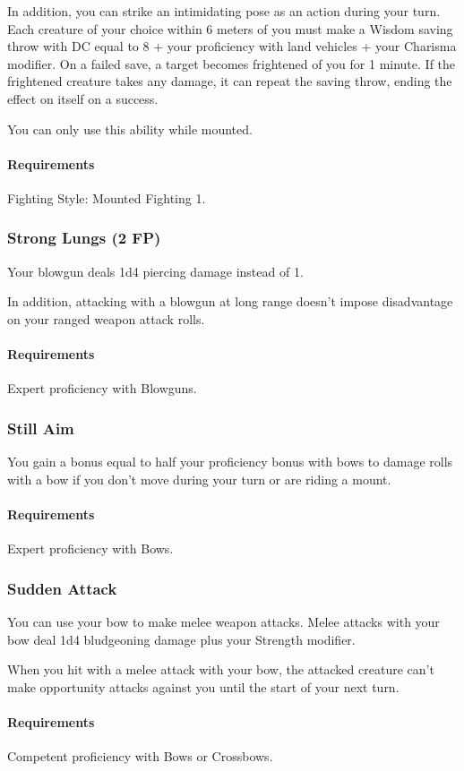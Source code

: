     In addition, you can strike an intimidating pose as an action during your turn.
    Each creature of your choice within 6 meters of you must make a Wisdom saving throw with DC equal to 8 + your proficiency with land vehicles + your Charisma modifier.
    On a failed save, a target becomes frightened of you for 1 minute.
    If the frightened creature takes any damage, it can repeat the saving throw, ending the effect on itself on a success.

    You can only use this ability while mounted.
    \paragraph{Requirements} Fighting Style: Mounted Fighting 1.
\subsubsection{Strong Lungs (2 FP)} \label{feat::stronglungs}
    Your blowgun deals 1d4 piercing damage instead of 1.

    In addition, attacking with a blowgun at long range doesn't impose disadvantage on your ranged weapon attack rolls.
    \paragraph{Requirements} Expert proficiency with Blowguns.
\subsubsection{Still Aim} \label{feat::stillaim}
    You gain a bonus equal to half your proficiency bonus with bows to damage rolls with a bow if you don't move during your turn or are riding a mount.
    \paragraph{Requirements} Expert proficiency with Bows.
\subsubsection{Sudden Attack} \label{feat::suddenattack}
    You can use your bow to make melee weapon attacks.
    Melee attacks with your bow deal 1d4 bludgeoning damage plus your Strength modifier.

    When you hit with a melee attack with your bow, the attacked creature can't make opportunity attacks against you until the start of your next turn.
    \paragraph{Requirements} Competent proficiency with Bows or Crossbows.
